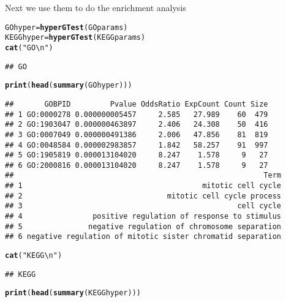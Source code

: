 \documentclass{article}\usepackage[]{graphicx}\usepackage[]{color}
\makeatletter
\newcommand{\hlstr}[1]{\textcolor[rgb]{0.192,0.494,0.8}{#1}}%
\newcommand{\hlstd}[1]{\textcolor[rgb]{0.345,0.345,0.345}{#1}}%
\newcommand{\hlkwb}[1]{\textcolor[rgb]{0.69,0.353,0.396}{#1}}%
\newcommand{\hlkwd}[1]{\textcolor[rgb]{0.737,0.353,0.396}{\textbf{#1}}}%
\newenvironment{kframe}{%
 \def\at@end@of@kframe{}%
 \ifinner\ifhmode%
  \def\at@end@of@kframe{\end{minipage}}%
  \begin{minipage}{\columnwidth}%
 \fi\fi%
 \def\FrameCommand##1{\hskip\@totalleftmargin \hskip-\fboxsep
 \colorbox{shadecolor}{##1}\hskip-\fboxsep
     \hskip-\linewidth \hskip-\@totalleftmargin \hskip\columnwidth}%
 \MakeFramed {\advance\hsize-\width
   \@totalleftmargin\z@ \linewidth\hsize
   \@setminipage}}%
 {\par\unskip\endMakeFramed%
 \at@end@of@kframe}
\newenvironment{knitrout}{}{} %
\makeatother
\begin{document}
Next we use them to do the enrichment analysis
\begin{knitrout}
\color{fgcolor}\begin{kframe}
\begin{alltt}
\hlstd{GOhyper} \hlkwb{=} \hlkwd{hyperGTest}\hlstd{(GOparams)}
\hlstd{KEGGhyper} \hlkwb{=} \hlkwd{hyperGTest}\hlstd{(KEGGparams)}
\hlkwd{cat}\hlstd{(}\hlstr{"GO\textbackslash{}n"}\hlstd{)}
\end{alltt}
\begin{verbatim}
## GO
\end{verbatim}
\begin{alltt}
\hlkwd{print}\hlstd{(}\hlkwd{head}\hlstd{(}\hlkwd{summary}\hlstd{(GOhyper)))}
\end{alltt}
\begin{verbatim}
##       GOBPID         Pvalue OddsRatio ExpCount Count Size
## 1 GO:0000278 0.000000005457     2.585   27.989    60  479
## 2 GO:1903047 0.000000463897     2.406   24.308    50  416
## 3 GO:0007049 0.000000491386     2.006   47.856    81  819
## 4 GO:0048584 0.000002983857     1.842   58.257    91  997
## 5 GO:1905819 0.000013104020     8.247    1.578     9   27
## 6 GO:2000816 0.000013104020     8.247    1.578     9   27
##                                                         Term
## 1                                         mitotic cell cycle
## 2                                 mitotic cell cycle process
## 3                                                 cell cycle
## 4                positive regulation of response to stimulus
## 5               negative regulation of chromosome separation
## 6 negative regulation of mitotic sister chromatid separation
\end{verbatim}
\begin{alltt}
\hlkwd{cat}\hlstd{(}\hlstr{"KEGG\textbackslash{}n"}\hlstd{)}
\end{alltt}
\begin{verbatim}
## KEGG
\end{verbatim}
\begin{alltt}
\hlkwd{print}\hlstd{(}\hlkwd{head}\hlstd{(}\hlkwd{summary}\hlstd{(KEGGhyper)))}
\end{alltt}



\end{kframe}
\end{knitrout}
\end{document}
